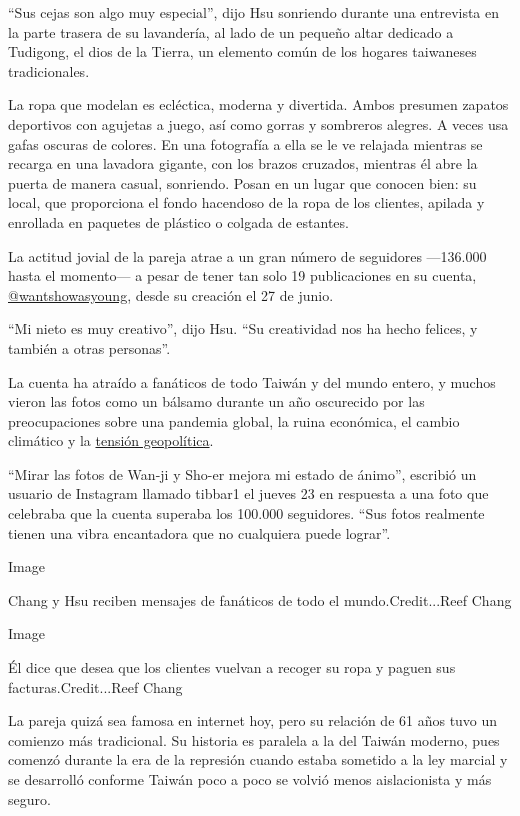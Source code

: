 ``Sus cejas son algo muy especial'', dijo Hsu sonriendo durante una
entrevista en la parte trasera de su lavandería, al lado de un pequeño
altar dedicado a Tudigong, el dios de la Tierra, un elemento común de
los hogares taiwaneses tradicionales.

La ropa que modelan es ecléctica, moderna y divertida. Ambos presumen
zapatos deportivos con agujetas a juego, así como gorras y sombreros
alegres. A veces usa gafas oscuras de colores. En una fotografía a ella
se le ve relajada mientras se recarga en una lavadora gigante, con los
brazos cruzados, mientras él abre la puerta de manera casual, sonriendo.
Posan en un lugar que conocen bien: su local, que proporciona el fondo
hacendoso de la ropa de los clientes, apilada y enrollada en paquetes de
plástico o colgada de estantes.

La actitud jovial de la pareja atrae a un gran número de seguidores
---136.000 hasta el momento--- a pesar de tener tan solo 19
publicaciones en su cuenta,
\href{https://www.instagram.com/wantshowasyoung/?hl=en}{@wantshowasyoung},
desde su creación el 27 de junio.

``Mi nieto es muy creativo'', dijo Hsu. ``Su creatividad nos ha hecho
felices, y también a otras personas''.

La cuenta ha atraído a fanáticos de todo Taiwán y del mundo entero, y
muchos vieron las fotos como un bálsamo durante un año oscurecido por
las preocupaciones sobre una pandemia global, la ruina económica, el
cambio climático y la
\href{https://www.nytimes.com/2020/07/01/world/asia/taiwan-china-hong-kong.html?searchResultPosition=1}{tensión
geopolítica}.

``Mirar las fotos de Wan-ji y Sho-er mejora mi estado de ánimo'',
escribió un usuario de Instagram llamado tibbar1 el jueves 23 en
respuesta a una foto que celebraba que la cuenta superaba los 100.000
seguidores. ``Sus fotos realmente tienen una vibra encantadora que no
cualquiera puede lograr''.

Image

Chang y Hsu reciben mensajes de fanáticos de todo el mundo.Credit...Reef
Chang

Image

Él dice que desea que los clientes vuelvan a recoger su ropa y paguen
sus facturas.Credit...Reef Chang

La pareja quizá sea famosa en internet hoy, pero su relación de 61 años
tuvo un comienzo más tradicional. Su historia es paralela a la del
Taiwán moderno, pues comenzó durante la era de la represión cuando
estaba sometido a la ley marcial y se desarrolló conforme Taiwán poco a
poco se volvió menos aislacionista y más seguro.

